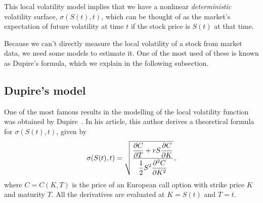 This local volatility model implies that we have a nonlinear \emph{deterministic} volatility surface, $\sigma(S(t),t)$, which can be thought of as the market's expectation of future volatility at time $t$ if the stock price is $S(t)$ at that time.



Because we can't directly measure the local volatility of a stock from market data, we need some models to estimate it. One of the most used of these is known as Dupire's formula, which we explain in the following subsection.


\subsection{Dupire's model}
\label{subsection:Dupire}
One of the most famous results in the modelling of the local volatility function was obtained by Dupire~\citep{Dupire}. In his article, this author derives a theoretical formula for $\sigma(S(t),t)$, given by
\begin{equation}\label{dupire}
\sigma(S(t),t)=\sqrt{\frac{\displaystyle\pdv{C}{T}+rS\pdv{C}{K}}{\displaystyle\frac{1}{2}S^2\pdv{^2C}{K^2}}},
\end{equation}
\noindent where $C=C(K,T)$ is the price of an European call option with strike price $K$ and maturity $T$. All the derivatives are evaluated at $K=S(t)$ and $T=t$.



